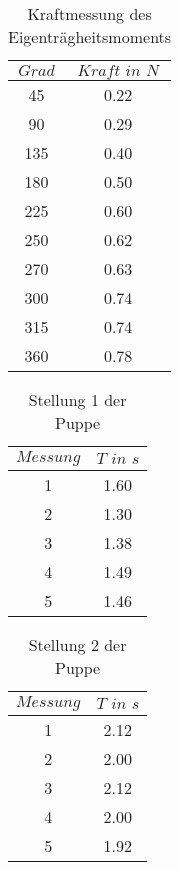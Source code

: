 \begin{table}
  \centering
  \caption{Kraftmessung des Eigenträgheitsmoments}
  \begin{tabular}{c c}
    \toprule
    $Grad$ & $Kraft\, \, in\, \,N$ \\
    \midrule
     45 & 0.22\\
     90 & 0.29\\
     135 & 0.40\\
     180 & 0.50\\
     225 & 0.60\\
     250 & 0.62\\
     270 & 0.63\\
     300 & 0.74\\
     315 & 0.74\\
     360 & 0.78\\
    \bottomrule
  \end{tabular}
\end{table}

\begin{table}
  \centering
  \caption{Stellung 1 der Puppe}
  \begin{tabular}{c c}
    \toprule
    $Messung$ & $T\, \, in \, \,s$ \\
    \midrule
     1 & 1.60\\
     2 & 1.30\\
     3 & 1.38\\
     4 & 1.49\\
     5 & 1.46\\
    \bottomrule
  \end{tabular}
\end{table}

\begin{table}
  \centering
  \caption{Stellung 2 der Puppe}
  \begin{tabular}{c c}
    \toprule
    $Messung$ & $T\, \, in \, \,s$ \\
    \midrule
     1 & 2.12\\
     2 & 2.00\\
     3 & 2.12\\
     4 & 2.00\\
     5 & 1.92\\
    \bottomrule
  \end{tabular}
\end{table}
